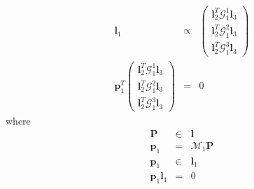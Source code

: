 \documentclass{beamer}
\newcommand{\tmmathbf}[1]{\ensuremath{\boldsymbol{#1}}}
\begin{document}
{{\begin{frame}
\end{frame}}{\begin{frame}
  
  \begin{eqnarray*}
    \tmmathbf{l}_1 & \propto & \left(\begin{array}{c}
      \tmmathbf{l}_2^T \mathcal{G}_1^1 \tmmathbf{l}_3\\
      \tmmathbf{l}_2^T \mathcal{G}_1^2 \tmmathbf{l}_3\\
      \tmmathbf{l}_2^T \mathcal{G}_1^3 \tmmathbf{l}_3
    \end{array}\right)\\
    \tmmathbf{p}_1^T \left(\begin{array}{c}
      \tmmathbf{l}_2^T \mathcal{G}_1^1 \tmmathbf{l}_3\\
      \tmmathbf{l}_2^T \mathcal{G}_1^2 \tmmathbf{l}_3\\
      \tmmathbf{l}_2^T \mathcal{G}_1^3 \tmmathbf{l}_3
    \end{array}\right) & = & 0
  \end{eqnarray*}
  where
  \begin{eqnarray*}
    \tmmathbf{P} & \in & \tmmathbf{l}\\
    \tmmathbf{p}_1 & = & \mathcal{M}_1 \tmmathbf{P}\\
    \tmmathbf{p}_1 & \in & \tmmathbf{l}_1\\
    \tmmathbf{p}_1 \tmmathbf{l}_1 & = & 0
  \end{eqnarray*}
\end{frame}}{\begin{frame}
  {\hspace{4em}}

\end{frame}}}
\end{document}
